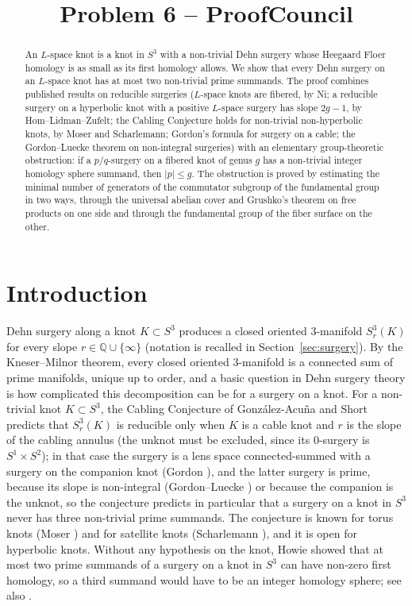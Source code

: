 \documentclass[12pt]{article}
\title{Problem 6 -- ProofCouncil}
\author{}
\date{}
\newcommand{\Q}{\mathbb Q}
\newcommand{\Surg}[2]{S^3_{#1}(#2)}
\theoremstyle{definition}
\theoremstyle{remark}
\begin{document}
\maketitle

\begin{abstract}
An \(L\)-space knot is a knot in \(S^3\) with a non-trivial Dehn surgery
whose Heegaard Floer homology is as small as its first homology allows.
We show that every Dehn surgery on an \(L\)-space knot has at most two
non-trivial prime summands. The proof combines published results on
reducible surgeries (\(L\)-space knots are fibered, by Ni; a reducible
surgery on a hyperbolic knot with a positive \(L\)-space surgery has slope
\(2g-1\), by Hom--Lidman--Zufelt; the Cabling Conjecture holds for
non-trivial non-hyperbolic knots, by Moser and Scharlemann; Gordon's
formula for
surgery on a cable; the Gordon--Luecke theorem on non-integral surgeries)
with an elementary group-theoretic obstruction: if a \(p/q\)-surgery on a
fibered knot of genus \(g\) has a non-trivial integer homology sphere
summand, then \(|p|\le g\). The obstruction is proved by estimating the
minimal number of generators of the commutator subgroup of the
fundamental group in two ways, through the universal abelian cover and
Grushko's theorem on free products on one side and through the
fundamental group of the fiber surface on the other.
\end{abstract}

\section{Introduction}\label{sec:intro}

Dehn surgery along a knot \(K\subset S^3\) produces a closed oriented
\(3\)-manifold \(\Surg{r}{K}\) for every slope
\(r\in\Q\cup\{\infty\}\) (notation is recalled in
Section~\ref{sec:surgery}). By the Kneser--Milnor theorem, every closed
oriented \(3\)-manifold is a connected sum of prime manifolds, unique up to
order, and a basic question in Dehn surgery theory is how complicated this
decomposition can be for a surgery on a knot. For a non-trivial knot
\(K\subset S^3\), the Cabling Conjecture of Gonz\'alez-Acu\~na and Short
\cite{GAS1986} predicts that \(\Surg{r}{K}\) is reducible only when
\(K\) is a cable knot and \(r\) is the slope of the cabling annulus (the
unknot must be excluded, since its \(0\)-surgery is \(S^1\times S^2\)); in
that case the surgery is a lens space connected-summed
with a surgery on the companion knot (Gordon \cite{Gordon1983}), and the
latter surgery is prime, because its slope is non-integral (Gordon--Luecke
\cite{GordonLuecke1987}) or because the companion is the unknot, so the
conjecture predicts in particular that a
surgery on a knot in \(S^3\) never has three non-trivial prime summands.
The conjecture is known for
torus knots (Moser \cite{Moser1971}) and for satellite knots (Scharlemann
\cite{Scharlemann1990}), and it is open for hyperbolic knots. Without any
hypothesis on the knot, Howie \cite{Howie2002} showed that at most two
prime summands of a surgery on a knot in \(S^3\) can have non-zero first
homology, so a third summand would have to be an integer homology sphere;
see also \cite{Howie2010}.
\end{document}
